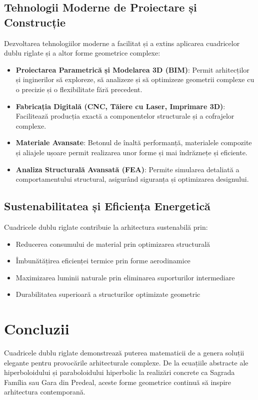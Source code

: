 \documentclass[12pt,a4paper]{article}
\begin{document}
\subsection{Tehnologii Moderne de Proiectare și Construcție}
Dezvoltarea tehnologiilor moderne a facilitat și a extins aplicarea cuadricelor dublu riglate și a altor forme geometrice complexe:
\begin{itemize}
    \item \textbf{Proiectarea Parametrică și Modelarea 3D (BIM)}: Permit arhitecților și inginerilor să exploreze, să analizeze și să optimizeze geometrii complexe cu o precizie și o flexibilitate fără precedent.
    \item \textbf{Fabricația Digitală (CNC, Tăiere cu Laser, Imprimare 3D)}: Facilitează producția exactă a componentelor structurale și a cofrajelor complexe.
    \item \textbf{Materiale Avansate}: Betonul de înaltă performanță, materialele compozite și aliajele ușoare permit realizarea unor forme și mai îndrăznețe și eficiente.
    \item \textbf{Analiza Structurală Avansată (FEA)}: Permite simularea detaliată a comportamentului structural, asigurând siguranța și optimizarea designului.
\end{itemize}

\subsection{Sustenabilitatea și Eficiența Energetică}

Cuadricele dublu riglate contribuie la arhitectura sustenabilă prin:

\begin{itemize}
    \item Reducerea consumului de material prin optimizarea structurală
    \item Îmbunătățirea eficienței termice prin forme aerodinamice
    \item Maximizarea luminii naturale prin eliminarea suporturilor intermediare
    \item Durabilitatea superioară a structurilor optimizate geometric
\end{itemize}

\section{Concluzii}

Cuadricele dublu riglate demonstrează puterea matematicii de a genera soluții elegante pentru provocările arhitecturale complexe. De la ecuațiile abstracte ale hiperboloidului și paraboloidului hiperbolic la realizări concrete ca Sagrada Família sau Gara din Predeal, aceste forme geometrice continuă să inspire arhitectura contemporană.
\end{document}

